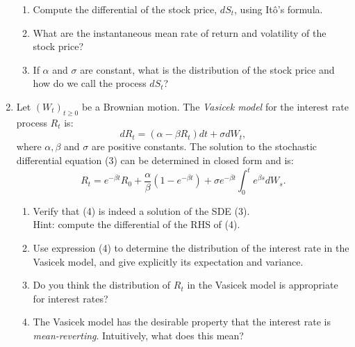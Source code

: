\documentclass[11pt,a4,table]{article}
\begin{document}
\begin{enumerate}
\begin{enumerate}
        \item Compute the differential of the stock price, $dS_t$, using Itô's formula.
    
        \item What are the instantaneous mean rate of return and volatility of the stock price?
        
        \item If $\alpha$ and $\sigma$ are constant, what is the distribution of the stock price and how do we call the process $dS_t$?
    \end{enumerate}

    
    \item Let $(W_t)_{t\geq 0}$ be a Brownian motion. The \textit{Vasicek model} for the interest rate process $R_t$ is:
    \begin{equation}
        dR_t=(\alpha-\beta R_t) dt + \sigma dW_t,
    \end{equation}
    where $\alpha, \beta$ and $\sigma$ are positive constants. The solution to the stochastic differential equation (3) can be determined in closed form and is:
    \begin{equation}
        R_t=e^{-\beta t} R_0 +\frac{\alpha}{\beta}(1-e^{-\beta t}) + \sigma e^{-\beta t} \int_0^t e^{\beta s} dW_s.
    \end{equation}
    
    \begin{enumerate}
        \item Verify that (4) is indeed a solution of the SDE (3).\\
              Hint: compute the differential of the RHS of (4).
        
        \item Use expression (4) to determine the distribution of the interest rate in the Vasicek model, and give explicitly its expectation and variance.
        
        \item Do you think the distribution of $R_t$ in the Vasicek model is appropriate for interest rates?
        
        \item The Vasicek model has the desirable property that the interest rate is \textit{mean-reverting}. Intuitively, what does this mean?
    \end{enumerate}
    

\end{enumerate}
\end{document}
